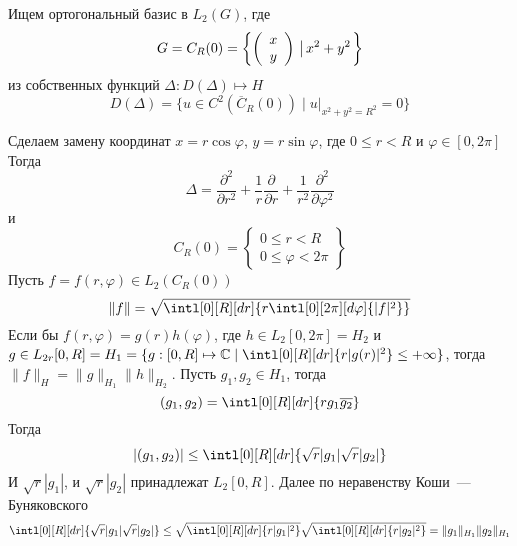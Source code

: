 \documentclass[14pt]{extarticle}
\newcommand{\vect}[2]{\left(
\begin{array}{c}
    #1\\
    #2
\end{array}\right)}
\begin{document}
Ищем ортогональный базис в $L_2(G)$, где
$$
G = C_R(0) = \left\{ \vect{x}{y} \left\arrowvert x^2 + y^2\right.\right\}
$$
из собственных функций $\Delta : D(\Delta) \mapsto H$
$$
D(\Delta) = \{u \in C^2(\overline{C}_R(0)) \mid u|_{x^2 + y^2 = R^2} = 0\}
$$

Сделаем замену координат $x = r \cos \varphi$, $y = r \sin \varphi$, где $0 \le r < R$ и
$\varphi \in [0, 2\pi]$
Тогда
$$
\Delta = \dfrac{\partial^2}{\partial r^2} + \dfrac{1}{r} \dfrac{\partial}{\partial r} + \dfrac{1}{r^2}
\dfrac{\partial^2}{\partial \varphi^2}
$$
и 
$$
C_R(0) = \left\{
\begin{array}{c}
    0 \le r < R\\
    0 \le \varphi < 2\pi
\end{array}
\right\}
$$
Пусть $f = f(r, \varphi) \in L_2(C_R(0))$
$$
\|f\| = \sqrt{\intl[0][R][dr]{r\intl[0][2\pi][d\varphi]{|f|^2}}}
$$
Если бы $f(r, \varphi) = g(r)h(\varphi)$, где $h \in L_2[0,2\pi] = H_2$
и $g \in L_{2r}[0, R] = H_1 = \{g : [0, R] \mapsto \mathbb C \mid \intl[0][R][dr]{r|g(r)|^2} \le 
+\infty\}$,
тогда $\|f\|_H = \|g\|_{H_1} \|h\|_{H_2}$.
Пусть $g_1, g_2 \in H_1$, тогда
$$
(g_1, g_2) = \intl[0][R][dr]{r g_1 \overline{g_2}}
$$
Тогда
$$
|(g_1, g_2)| \le \intl[0][R][dr]{\sqrt{r} |g_1| \sqrt{r} |g_2|}
$$
И $\sqrt{r} |g_1|$, и $\sqrt{r} |g_2|$ принадлежат $L_2[0,R]$.
Далее по неравенству Коши~--- Буняковского
$$
\intl[0][R][dr]{\sqrt{r} |g_1| \sqrt{r} |g_2|} \le \sqrt{\intl[0][R][dr]{r|g_1|^2}}
\sqrt{\intl[0][R][dr]{r|g_2|^2}} = \|g_1\|_{H_1} \|g_2\|_{H_1}
$$
\end{document}
